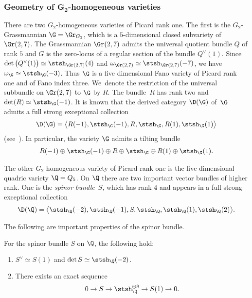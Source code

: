 \subsubsection[Geometry of G2-homogeneous varieties]
{Geometry of $\boldsymbol{G_2}$-homogeneous varieties}\label{geom of homog bdls}
There are two $G_2$-homogeneous varieties of Picard rank one.
The first is the $G_2$-Grassmannian $\G = \Gr_{G_2}$, which is a $5$-dimensional closed subvariety of $\Gr(2,7)$.
The Grassmannian $\Gr(2,7)$ admits the universal quotient bundle $Q$ of rank $5$
and $G$ is the zero-locus of a regular section of the bundle $Q^{\vee}(1)$.
Since $\det\big(Q^{\vee}(1)\big) \simeq \stsh_{\Gr(2,7)}(4)$ and $\omega_{\Gr(2,7)} \simeq \stsh_{\Gr(2,7)}(-7)$,
we have $\omega_{\G} \simeq \stsh_{\G}(-3)$.
Thus $\G$ is a five dimensional Fano variety of Picard rank one and of Fano index three.
We~denote the restriction of the universal subbundle on $\Gr(2,7)$ to $\G$ by $R$.
The bundle~$R$ has rank two and $\det(R) \simeq \stsh_{\G}(-1)$.
It is known that the derived category $\D(\G)$ of~$\G$ admits a full strong exceptional collection
\begin{gather*}
\D(\G) = \big\langle R(-1), \stsh_{\G}(-1), R, \stsh_{\G}, R(1), \stsh_{\G}(1)\big\rangle
\end{gather*}
(see~\cite{Kuz06}).
In particular, the variety $\G$ admits a tilting bundle
\begin{gather*}
R(-1) \oplus \stsh_{\G}(-1) \oplus R \oplus \stsh_{\G} \oplus R(1) \oplus \stsh_{\G}(1).
\end{gather*}

The other $G_2$-homogeneous variety of Picard rank one is the five dimensional quadric variety $\Q = Q_5$.
On $\Q$ there are two important vector bundles of higher rank.
One is the \textit{spinor bundle}~$S$, which has rank $4$ and appears in a full strong exceptional collection
\begin{gather*}
\D(\Q) = \big\langle \stsh_{\Q}(-2), \stsh_{\Q}(-1), S, \stsh_{\Q}, \stsh_{\Q}(1), \stsh_{\Q}(2) \big\rangle.
\end{gather*}

The following are important properties of the spinor bundle.

\begin{Lemma} \label{lemma spinor quadric}
For the spinor bundle $S$ on $\Q$, the following hold:
\begin{enumerate}\itemsep=0pt
\item[$1.$] $S^{\vee} \simeq S(1)$ and $\det S \simeq \stsh_{\Q}(-2)$.
\item[$2.$] There exists an exact sequence
\begin{gather*}
0 \to S \to \stsh_{\Q}^{\oplus 8} \to S(1) \to 0.
\end{gather*}
\end{enumerate}
\end{Lemma}

